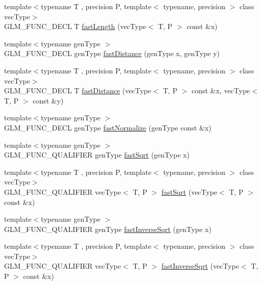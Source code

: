 \begin{DoxyCompactItemize}
\item 
{\footnotesize template$<$typename T , precision P, template$<$ typename, precision $>$ class vec\+Type$>$ }\\G\+L\+M\+\_\+\+F\+U\+N\+C\+\_\+\+D\+E\+C\+L T \hyperlink{group__gtx__fast__square__root_gae28a3099cbd6404a4ea8ef22147ed7b0}{fast\+Length} (vec\+Type$<$ T, P $>$ const \&x)
\item 
{\footnotesize template$<$typename gen\+Type $>$ }\\G\+L\+M\+\_\+\+F\+U\+N\+C\+\_\+\+D\+E\+C\+L gen\+Type \hyperlink{group__gtx__fast__square__root_gaac333418d0c4e0cc6d3d219ed606c238}{fast\+Distance} (gen\+Type x, gen\+Type y)
\item 
{\footnotesize template$<$typename T , precision P, template$<$ typename, precision $>$ class vec\+Type$>$ }\\G\+L\+M\+\_\+\+F\+U\+N\+C\+\_\+\+D\+E\+C\+L T \hyperlink{group__gtx__fast__square__root_ga6d1ac559cd77d69119e30c3aca0e14b5}{fast\+Distance} (vec\+Type$<$ T, P $>$ const \&x, vec\+Type$<$ T, P $>$ const \&y)
\item 
{\footnotesize template$<$typename gen\+Type $>$ }\\G\+L\+M\+\_\+\+F\+U\+N\+C\+\_\+\+D\+E\+C\+L gen\+Type \hyperlink{group__gtx__fast__square__root_ga3b02c1d6e0c754144e2f1e110bf9f16c}{fast\+Normalize} (gen\+Type const \&x)
\item 
{\footnotesize template$<$typename gen\+Type $>$ }\\G\+L\+M\+\_\+\+F\+U\+N\+C\+\_\+\+Q\+U\+A\+L\+I\+F\+I\+E\+R gen\+Type \hyperlink{group__gtx__fast__square__root_ga6c460e9414a50b2fc455c8f64c86cdc9}{fast\+Sqrt} (gen\+Type x)
\item 
{\footnotesize template$<$typename T , precision P, template$<$ typename, precision $>$ class vec\+Type$>$ }\\G\+L\+M\+\_\+\+F\+U\+N\+C\+\_\+\+Q\+U\+A\+L\+I\+F\+I\+E\+R vec\+Type$<$ T, P $>$ \hyperlink{group__gtx__fast__square__root_gaad9f601bbc3faa04dda384e4c4e1592c}{fast\+Sqrt} (vec\+Type$<$ T, P $>$ const \&x)
\item 
{\footnotesize template$<$typename gen\+Type $>$ }\\G\+L\+M\+\_\+\+F\+U\+N\+C\+\_\+\+Q\+U\+A\+L\+I\+F\+I\+E\+R gen\+Type \hyperlink{group__gtx__fast__square__root_ga7f081b14d9c7035c8714eba5f7f75a8f}{fast\+Inverse\+Sqrt} (gen\+Type x)
\item 
{\footnotesize template$<$typename T , precision P, template$<$ typename, precision $>$ class vec\+Type$>$ }\\G\+L\+M\+\_\+\+F\+U\+N\+C\+\_\+\+Q\+U\+A\+L\+I\+F\+I\+E\+R vec\+Type$<$ T, P $>$ \hyperlink{group__gtx__fast__square__root_ga903878071f92e51e551791e584a171a1}{fast\+Inverse\+Sqrt} (vec\+Type$<$ T, P $>$ const \&x)

\end{DoxyCompactItemize}
